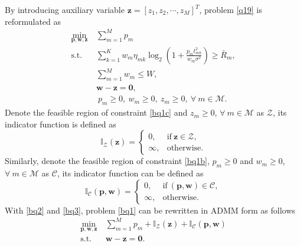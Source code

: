 \documentclass[journal]{IEEEtran}
\begin{document}
By introducing auxiliary variable $\mathbf{z} = \left[z_1, z_2, \cdots, z_M\right]^T$, problem \eqref{q19} is reformulated as
\begin{subequations}\label{bq1}
\begin{align}
\label{bq1a}\min_{\mathbf{p}, \mathbf{w}, \mathbf{z}}\ & \sum\limits_{m=1}^{M} p_m \\
\label{bq1b} \mbox{s.t.}\ \ &\sum\limits_{k= 1}^{K}w_m \eta_{mk}\log_2\left(1 + \frac{p_mt_{mk}^2}{w_m\sigma^2}\right)\geq \bar{R}_m,\\
\label{bq1c} &\sum_{m=1}^{M} w_m \leq W,\\
\label{bq1d} &\mathbf{w} - \mathbf{z} = \mathbf{0},\\
\label{bq1e} &\ p_m \geq 0,\ w_m \geq 0,\ z_m \geq 0,\ \forall\ m\in\mathcal{M}.
\end{align}
\end{subequations}
Denote the feasible region of constraint \eqref{bq1c} and $z_m\geq 0$, $\forall\ m\in\mathcal{M}$ as $\mathcal{Z}$, its indicator function is defined as
\begin{equation}\label{bq2}
\mathbb{I}_\mathcal{Z}\left(\mathbf{z}\right) = \left\{ \begin{array}{lcl}
0, &\mbox{if} \ \mathbf{z} \in \mathcal{Z}, \\
\infty, &\mbox{otherwise}.
\end{array}
\right.
\end{equation}
Similarly, denote the feasible region of constraint \eqref{bq1b}, $p_m\geq 0$ and $w_m\geq 0$, $\forall\ m\in\mathcal{M}$ as $\mathcal{C}$, its indicator function can be defined as
\begin{equation}\label{bq3}
\mathbb{I}_\mathcal{C}\left(\mathbf{p},\mathbf{w}\right) = \left\{ \begin{array}{lcl}
0, &\mbox{if} \ \left(\mathbf{p}, \mathbf{w}\right) \in \mathcal{C}, \\
\infty, &\mbox{otherwise}.
\end{array}
\right.
\end{equation}
With \eqref{bq2} and \eqref{bq3}, problem \eqref{bq1} can be rewritten in ADMM form as follows
\begin{subequations}\label{bq4}
\begin{align}\label{bq4a}
\min_{\mathbf{p}, \mathbf{w}, \mathbf{z}}\ & \sum\limits_{m=1}^{M} p_m + \mathbb{I}_\mathcal{Z}\left(\mathbf{z}\right) + \mathbb{I}_\mathcal{C}\left(\mathbf{p},\mathbf{w}\right)\\
\label{bq4b}\mbox{s.t.}\ \ &  \mathbf{w} - \mathbf{z} = \mathbf{0}.
\end{align}
\end{subequations}
\end{document}
